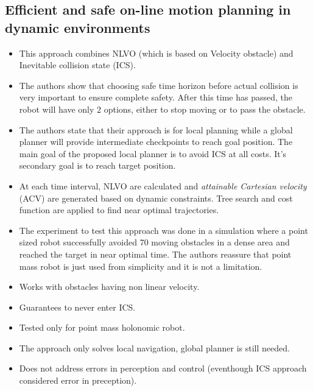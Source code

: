 \documentclass[11pt]{article}
\begin{document}
\subsection{Efficient and safe on-line motion planning in dynamic environments\cite{gal2009efficient}}
\begin{itemize}
    \item This approach combines NLVO\cite{shiller2001motion} (which is based on Velocity obstacle\cite{fiorini1998motion}) and Inevitable collision state (ICS)\cite{fraichard2004inevitable}.
    \item The authors show that choosing safe time horizon before actual collision is very important to ensure complete safety. After this time has passed, the robot will have only 2 options, either to stop moving or to pass the obstacle.
    \item The authors state that their approach is for local planning while a global planner will provide intermediate checkpoints to reach goal position. The main goal of the proposed local planner is to avoid ICS at all costs. It's secondary goal is to reach target position.
    \item At each time interval, NLVO are calculated and \textit{attainable Cartesian velocity} (ACV) are generated based on dynamic constraints. Tree search and cost function are applied to find near optimal trajectories.
    \item The experiment to test this approach was done in a simulation where a point sized robot successfully avoided 70 moving obstacles in a dense area and reached the target in near optimal time. The authors reassure that point mass robot is just used from simplicity and it is not a limitation.
        \color{green}
    \item Works with obstacles having non linear velocity.
    \item Guarantees to never enter ICS\@.
        \color{red}
    \item Tested only for point mass holonomic robot.
    \item The approach only solves local navigation, global planner is still needed.
    \item Does not address errors in perception and control (eventhough ICS approach\cite{fraichard2004inevitable} considered error in preception).
\end{itemize}
\end{document}
